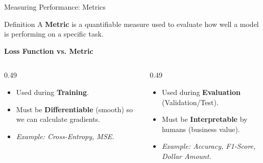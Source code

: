 

\begin{frame}{Measuring Performance: Metrics}

    \begin{block}{Definition}
        A \textbf{Metric} is a quantifiable measure used to evaluate how well a model is performing on a specific task.
    \end{block}

    
    \textbf{Loss Function vs. Metric}
    \vspace{-1em}
    
    \begin{columns}[T]
        \begin{column}{0.49\textwidth}
            \begin{tcolorbox}[colback=blue!5, colframe=blue!50, title=Loss (For the Machine)]
                \small
                \begin{itemize}
                    \item Used during \textbf{Training}.
                    \item Must be \textbf{Differentiable} (smooth) so we can calculate gradients.
                    \item \textit{Example: Cross-Entropy, MSE.}
                \end{itemize}
            \end{tcolorbox}
        \end{column}
        
        \begin{column}{0.49\textwidth}
            \begin{tcolorbox}[colback=darkred!5, colframe=darkred!90, title=Metric (For the Human)]
                \small
                \begin{itemize}
                    \item Used during \textbf{Evaluation} (Validation/Test).
                    \item Must be \textbf{Interpretable} by humans (business value).
                    \item \textit{Example: Accuracy, F1-Score, Dollar Amount.}
                \end{itemize}
            \end{tcolorbox}
        \end{column}
    \end{columns}
\end{frame}

